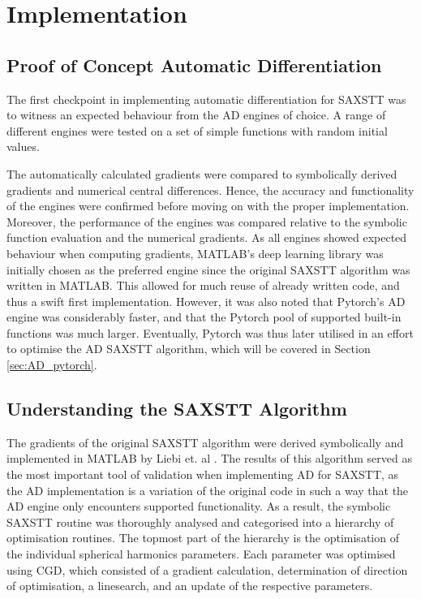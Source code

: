 
\chapter{Implementation}

\section{Proof of Concept Automatic Differentiation}\label{sec:proof_of_concept_AD}

The first checkpoint in implementing automatic differentiation for SAXSTT was to witness an expected behaviour from the AD engines of choice.
A range of different engines were tested on a set of simple functions with random initial values.

The automatically calculated gradients were compared to symbolically derived gradients and numerical central differences.
Hence, the accuracy and functionality of the engines were confirmed before moving on with the proper implementation.
Moreover, the performance of the engines was compared relative to the symbolic function evaluation and the numerical gradients.
As all engines showed expected behaviour when computing gradients,
MATLAB's deep learning library was initially chosen as the preferred engine since the original SAXSTT algorithm was written in MATLAB.
This allowed for much reuse of already written code, and thus a swift first implementation.
However, it was also noted that Pytorch's AD engine was considerably faster, and that the Pytorch pool of supported built-in functions was much larger.
Eventually, Pytorch was thus later utilised in an effort to optimise the AD SAXSTT algorithm, which will be covered in Section \ref{sec:AD_pytorch}.


\section{Understanding the SAXSTT Algorithm}\label{sec:understanding_SAXSTT}
The gradients of the original SAXSTT algorithm were derived symbolically and implemented in MATLAB by Liebi et. al \cite{liebi2015nanostructure}.
The results of this algorithm served as the most important tool of validation when implementing AD for SAXSTT,
as the AD implementation is a variation of the original code in such a way that the AD engine only encounters supported functionality.
As a result, the symbolic SAXSTT routine was thoroughly analysed and categorised into a hierarchy of optimisation routines. %
The topmost part of the hierarchy is the optimisation of the individual spherical harmonics parameters.
Each parameter was optimised using CGD,
which consisted of a gradient calculation, determination of direction of optimisation, a linesearch, and an update of the respective parameters.

